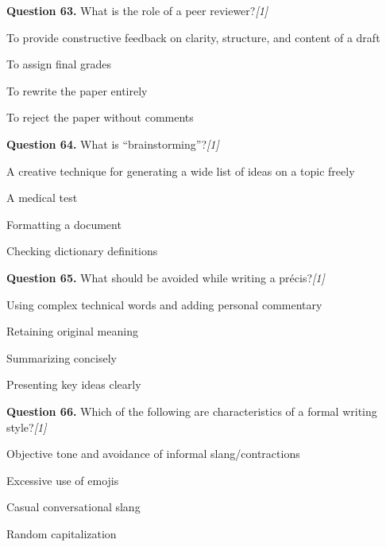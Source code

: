 \documentclass[11pt,a4paper]{article}
\newcommand{\pts}[1]{\hfill   \textit{[#1]}}
\begin{document}
\medskip




\noindent   \textbf{Question 63.} What is the role of a peer reviewer?\pts{1}

\begin{parts}
  \item To provide constructive feedback on clarity, structure, and content of a draft
  \item To assign final grades
  \item To rewrite the paper entirely
  \item To reject the paper without comments
\end{parts}

\medskip




\noindent   \textbf{Question 64.} What is ``brainstorming''?\pts{1}

\begin{parts}
  \item A creative technique for generating a wide list of ideas on a topic freely
  \item A medical test
  \item Formatting a document
  \item Checking dictionary definitions
\end{parts}

\medskip




\noindent   \textbf{Question 65.} What should be avoided while writing a précis?\pts{1}

\begin{parts}
  \item Using complex technical words and adding personal commentary
  \item Retaining original meaning
  \item Summarizing concisely
  \item Presenting key ideas clearly
\end{parts}

\medskip




\noindent   \textbf{Question 66.} Which of the following are characteristics of a formal writing style?\pts{1}

\begin{parts}
  \item Objective tone and avoidance of informal slang/contractions
  \item Excessive use of emojis
  \item Casual conversational slang
  \item Random capitalization
\end{parts}
\end{document}
